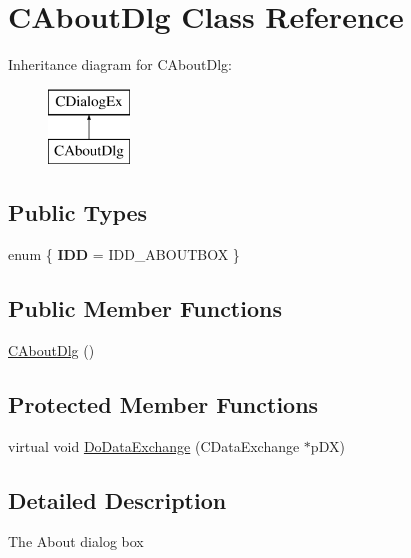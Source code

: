 \hypertarget{class_c_about_dlg}{}\section{C\+About\+Dlg Class Reference}
\label{class_c_about_dlg}
Inheritance diagram for C\+About\+Dlg\+:\begin{figure}[H]
\begin{center}
\leavevmode
\includegraphics[height=2.000000cm]{class_c_about_dlg}
\end{center}
\end{figure}
\subsection*{Public Types}
\begin{DoxyCompactItemize}
\item 
\hypertarget{class_c_about_dlg_a27a5d4c47f16acb8562522fcd22871f7}{}enum \{ {\bfseries I\+D\+D} = I\+D\+D\+\_\+\+A\+B\+O\+U\+T\+B\+O\+X
 \}\label{class_c_about_dlg_a27a5d4c47f16acb8562522fcd22871f7}

\end{DoxyCompactItemize}
\subsection*{Public Member Functions}
\begin{DoxyCompactItemize}
\item 
\hyperlink{class_c_about_dlg_a6d1e6a33fef23bee6e75254189d865ce}{C\+About\+Dlg} ()
\end{DoxyCompactItemize}
\subsection*{Protected Member Functions}
\begin{DoxyCompactItemize}
\item 
virtual void \hyperlink{class_c_about_dlg_ab83db7484fec957282d7d5a21aed4df4}{Do\+Data\+Exchange} (C\+Data\+Exchange $\ast$p\+D\+X)
\end{DoxyCompactItemize}


\subsection{Detailed Description}
The About dialog box 

